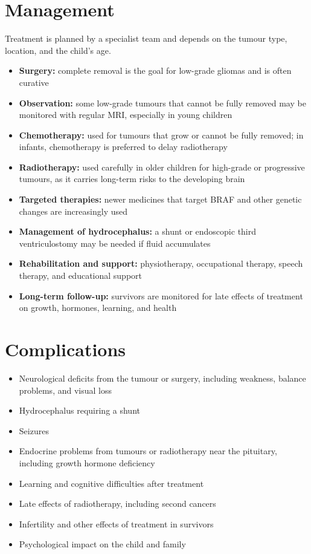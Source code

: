 \section*{Management}
Treatment is planned by a specialist team and depends on the tumour type, location, and the child's age.

\begin{itemize}
    \item \textbf{Surgery:} complete removal is the goal for low-grade gliomas and is often curative
    \item \textbf{Observation:} some low-grade tumours that cannot be fully removed may be monitored with regular MRI, especially in young children
    \item \textbf{Chemotherapy:} used for tumours that grow or cannot be fully removed; in infants, chemotherapy is preferred to delay radiotherapy
    \item \textbf{Radiotherapy:} used carefully in older children for high-grade or progressive tumours, as it carries long-term risks to the developing brain
    \item \textbf{Targeted therapies:} newer medicines that target BRAF and other genetic changes are increasingly used
    \item \textbf{Management of hydrocephalus:} a shunt or endoscopic third ventriculostomy may be needed if fluid accumulates
    \item \textbf{Rehabilitation and support:} physiotherapy, occupational therapy, speech therapy, and educational support
    \item \textbf{Long-term follow-up:} survivors are monitored for late effects of treatment on growth, hormones, learning, and health
\end{itemize}

\section*{Complications}
\begin{itemize}
    \item Neurological deficits from the tumour or surgery, including weakness, balance problems, and visual loss
    \item Hydrocephalus requiring a shunt
    \item Seizures
    \item Endocrine problems from tumours or radiotherapy near the pituitary, including growth hormone deficiency
    \item Learning and cognitive difficulties after treatment
    \item Late effects of radiotherapy, including second cancers
    \item Infertility and other effects of treatment in survivors
    \item Psychological impact on the child and family
\end{itemize}

